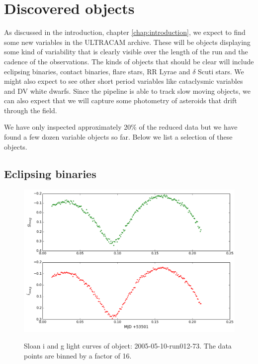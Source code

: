 \section{Discovered objects}
As discussed in the introduction, chapter \ref{chap:introduction}, we expect to find some new variables in the ULTRACAM archive. These will be objects displaying some kind of variability that is clearly visible over the length of the run and the cadence of the observations. The kinds of objects that should be clear will include eclipsing binaries, contact binaries, flare stars, RR Lyrae and $\delta$ Scuti stars. We might also expect to see other short period variables like cataclysmic variables and DV white dwarfs. Since the pipeline is able to track slow moving objects, we can also expect that we will capture some photometry of asteroids that drift through the field.   

We have only inspected approximately 20\% of the reduced data but we have found a few dozen variable objects so far. Below we list a selection of these objects. 

\newpage
\subsection{Eclipsing binaries}

  \begin{figure}
    \center
    \includegraphics[width=120mm]{images/2005-05-10-run012-lightcurve-bin16.png} 
    \label{fig:2005-05-10-run012}
    \caption{Sloan i and g light curves of object: 2005-05-10-run012-73. The data points are binned by a factor of 16. }
  \end{figure}
  
